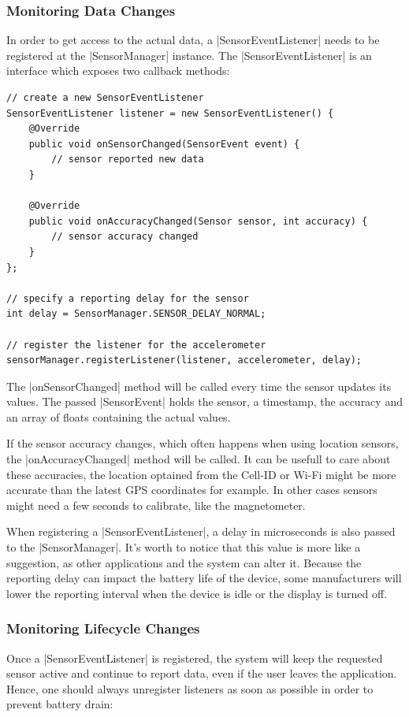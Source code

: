 \subsubsection{Monitoring Data Changes}
\label{sec:implementation:monitoringdatachanges}
In order to get access to the actual data, a |SensorEventListener|\cite{androiddocs:sensoreventlistener} needs to be registered at the |SensorManager| instance. The |SensorEventListener| is an interface which exposes two callback methods:

\begin{lstlisting}[label=registersensoreventlistener]
// create a new SensorEventListener
SensorEventListener listener = new SensorEventListener() {
	@Override
	public void onSensorChanged(SensorEvent event) {
		// sensor reported new data
	}

	@Override
	public void onAccuracyChanged(Sensor sensor, int accuracy) {
		// sensor accuracy changed
	}
};

// specify a reporting delay for the sensor
int delay = SensorManager.SENSOR_DELAY_NORMAL;

// register the listener for the accelerometer
sensorManager.registerListener(listener, accelerometer, delay);
\end{lstlisting}

The |onSensorChanged| method will be called every time the sensor updates its values. The passed |SensorEvent|\cite{androiddocs:sensorevent} holds the sensor, a timestamp, the accuracy and an array of floats containing the actual values.

If the sensor accuracy changes, which often happens when using location sensors, the |onAccuracyChanged| method will be called.
It can be usefull to care about these accuracies, the location optained from the Cell-ID or Wi-Fi might be more accurate than the latest GPS coordinates for example.
In other cases sensors might need a few seconds to calibrate, like the magnetometer.

When registering a |SensorEventListener|, a delay in microseconds is also passed to the |SensorManager|.
It's worth to notice that this value is more like a suggestion, as other applications and the system can alter it.
Because the reporting delay can impact the battery life of the device, some manufacturers will lower the reporting interval when the device is idle or the display is turned off.

\subsubsection{Monitoring Lifecycle Changes}
\label{sec:implementation:monitoringlifecyclechanges}
Once a |SensorEventListener| is registered, the system will keep the requested sensor active and continue to report data, even if the user leaves the application.
Hence, one should always unregister listeners as soon as possible in order to prevent battery drain:

